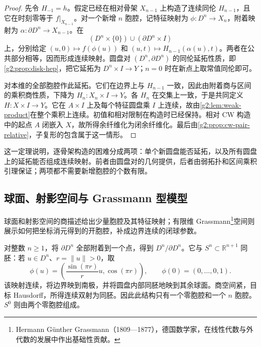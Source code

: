 \begin{proof}
	先令 \(H_{-1}=h\)。假定已经在相对骨架 \(X_{n-1}\) 上构造了连续同伦 \(H_{n-1}\)，且它在时刻零等于 \(f|_{X_{n-1}}\)。对一个新增 \(n\) 胞腔，记特征映射为 \(\phi:D^n\to X_n\)，附着映射为 \(\alpha:\partial D^n\to X_{n-1}\)。在
	\[
		(D^n\times\{0\})\cup(\partial D^n\times I)
	\]
	上，分别给定 \((u,0)\mapsto f(\phi(u))\) 和 \((u,t)\mapsto H_{n-1}(\alpha(u),t)\)。两者在公共部分相等，因而形成连续映射。圆盘对 \((D^n,\partial D^n)\) 的同伦延拓性质，即\cref{g2:prop:disk-hep}，把它延拓为 \(D^n\times I\to Y\)；\(n=0\) 时在新点上取常值同伦即可。

	对本维的全部胞腔作此延拓。它们在边界上与 \(H_{n-1}\) 一致，因此由附着商与区间的乘积商性质，下降为 \(H_n:X_n\times I\to Y\)。各 \(H_n\) 在交集上一致，于是共同定义 \(H:X\times I\to Y\)。它在 \(A\times I\) 上及每个特征圆盘乘 \(I\) 上连续，故由\cref{g2:lem:weak-product}在整个乘积上连续。初值和相对限制在构造时已经保持。相对 CW 构造中的起点 \(A\) 闭嵌入 \(X\)，故所得余纤维化为闭余纤维化。最后由\cref{g2:prop:cw-pair-relative}，子复形的包含属于这一情形。
\end{proof}

这一定理说明，逐骨架构造的困难分成两项：单个新圆盘能否延拓，以及所有圆盘上的延拓能否组成连续映射。前者由圆盘对的几何提供，后者由弱拓扑和区间乘积引理保证；两项都不需要新增胞腔的个数有限。

\subsection{球面、射影空间与 Grassmann 型模型}
\label{g2:subsec:0103:04}
球面和射影空间的商描述给出少量胞腔及其特征映射；有限维 Grassmann\footnote{Hermann Günther Grassmann（1809—1877），德国数学家，在线性代数与外代数的发展中作出基础性贡献。}空间则展示如何把坐标消元得到的开胞腔，补成边界连续的闭球参数。

\begin{example}
	\label{g2:exm:sphere-cw}
	对整数 \(n\geq1\)，将 \(\partial D^n\) 全部附着到一个点，得到 \(D^n/\partial D^n\)。它与 \(S^n\subset\mathbb R^{n+1}\) 同胚：若 \(u\in D^n\)、\(r=\|u\|>0\)，取
	\[
		\phi(u)=\left(\frac{\sin(\pi r)}{r}u,\cos(\pi r)\right),\qquad
		\phi(0)=(0,\ldots,0,1).
	\]
	该映射连续，将边界映到南极，并将圆盘内部同胚地映到其余球面。商空间紧，目标 Hausdorff，所得连续双射为同胚。因此此结构只有一个零胞腔和一个 \(n\) 胞腔。\(S^0\) 则由两个零胞腔组成。
\end{example}

